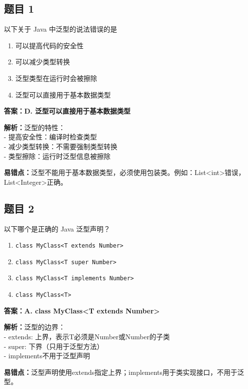 \documentclass[12pt,a4paper]{ctexart}
\begin{document}
\subsection*{题目 1}
以下关于 Java 中泛型的说法错误的是
\begin{enumerate}[label=\Alph*.]
	\item 可以提高代码的安全性
	\item 可以减少类型转换
	\item 泛型类型在运行时会被擦除
	\item 泛型可以直接用于基本数据类型
\end{enumerate}

\begin{answerbox}
	\textbf{答案：D. 泛型可以直接用于基本数据类型}

	\textbf{解析：}泛型的特性：\\
	- 提高安全性：编译时检查类型\\
	- 减少类型转换：不需要强制类型转换\\
	- 类型擦除：运行时泛型信息被擦除

	\textbf{易错点：}泛型不能用于基本数据类型，必须使用包装类。例如：List<int>错误，List<Integer>正确。
\end{answerbox}

\subsection*{题目 2}
以下哪个是正确的 Java 泛型声明？
\begin{enumerate}[label=\Alph*.]
	\item \texttt{class MyClass<T extends Number>}
	\item \texttt{class MyClass<T super Number>}
	\item \texttt{class MyClass<T implements Number>}
	\item \texttt{class MyClass<T>}
\end{enumerate}

\begin{answerbox}
	\textbf{答案：A. class MyClass<T extends Number>}

	\textbf{解析：}泛型的边界：\\
	- extends: 上界，表示T必须是Number或Number的子类\\
	- super: 下界（只用于泛型方法）\\
	- implements不用于泛型声明

	\textbf{易错点：}泛型声明使用extends指定上界；implements用于类实现接口，不用于泛型。
\end{answerbox}
\end{document}
